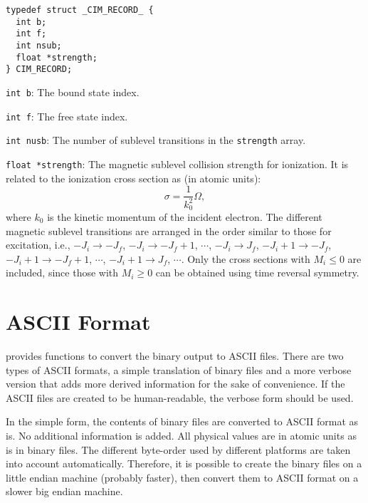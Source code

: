 \begin{verbatim}
typedef struct _CIM_RECORD_ {
  int b;
  int f;
  int nsub;
  float *strength;
} CIM_RECORD;
\end{verbatim}

\begin{dbdesc}
\item[\texttt{int b}:] The bound state index.
\item[\texttt{int f}:] The free state index.
\item[\texttt{int nusb}:] The number of sublevel transitions in the
  \texttt{strength} array. 
\item[\texttt{float *strength}:] The magnetic sublevel collision strength for
  ionization. It is related to the ionization cross section as (in atomic
  units): 
\begin{equation}
\sigma = \frac{1}{k_0^2}\Omega,
\end{equation}
where ${k_0}$ is the kinetic momentum of the incident electron. The different
magnetic sublevel transitions are arranged in the order similar to those for
excitation, i.e., $-J_i\to -J_f$, $-J_i\to -J_f+1$, $\cdots$, $-J_i\to J_f$,
$-J_i+1\to -J_f$, $-J_i+1\to -J_f+1$, $\cdots$, $-J_i+1\to J_f$,
$\cdots$. Only the cross sections with $M_i \le 0$ are included, since those
with $M_i \ge 0$ can be obtained using time reversal symmetry.

\end{dbdesc}


\section{ASCII Format}
\cFAC provides functions to convert the binary output to ASCII files. There are
two types of ASCII formats, a simple translation of binary files and a more
verbose version that adds more derived information for the sake of
convenience. If the ASCII files are created to be human-readable, the
verbose form should be used.

In the simple form, the contents of binary files are converted to ASCII format
as is. No additional information is added. All physical values are in atomic
units as is in binary files. The different byte-order used by different
platforms are taken into account automatically. Therefore, it is possible to
create the binary files on a little endian machine (probably faster), then
convert them to ASCII format on a slower big endian machine.

